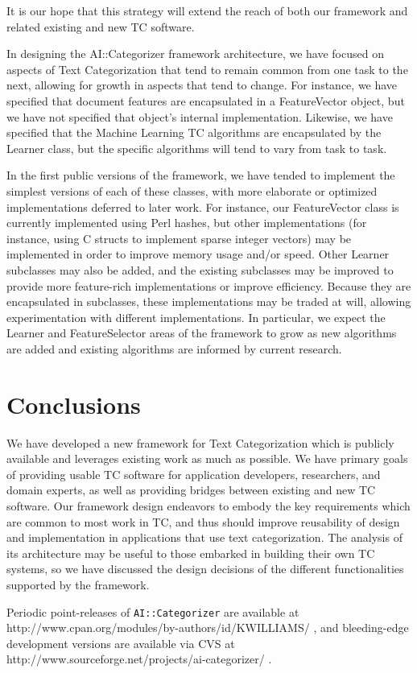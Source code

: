\documentclass[twocolumn]{article}
\begin{document}
It is our hope that this strategy will extend the reach of both our
framework and related existing and new TC software.

In designing the AI::Categorizer framework architecture, we have
focused on aspects of Text Categorization that tend to remain common
from one task to the next, allowing for growth in aspects that tend to
change.  For instance, we have specified that document features are
encapsulated in a FeatureVector object, but we have not specified that
object's internal implementation.  Likewise, we have specified that
the Machine Learning TC algorithms are encapsulated by the Learner
class, but the specific algorithms will tend to vary from task to
task.

In the first public versions of the framework, we have tended to
implement the simplest versions of each of these classes, with more
elaborate or optimized implementations deferred to later work.  For
instance, our FeatureVector class is currently implemented using Perl
hashes, but other implementations (for instance, using C structs to
implement sparse integer vectors) may be implemented in order to
improve memory usage and/or speed.  Other Learner subclasses may also
be added, and the existing subclasses may be improved to provide more
feature-rich implementations or improve efficiency.  Because they are
encapsulated in subclasses, these implementations may be traded at
will, allowing experimentation with different implementations.  In
particular, we expect the Learner and FeatureSelector areas of the
framework to grow as new algorithms are added and existing algorithms
are informed by current research.


\section{Conclusions}

We have developed a new framework for Text Categorization which is
publicly available and leverages existing work as much as possible.
We have primary goals of providing usable TC software for application
developers, researchers, and domain experts, as well as providing
bridges between existing and new TC software.  Our framework design
endeavors to embody the key requirements which are common to most work
in TC, and thus should improve reusability of design and
implementation in applications that use text categorization.  The
analysis of its architecture may be useful to those embarked in building
their own TC systems, so we have discussed the design decisions of the
different functionalities supported by the framework.

Periodic point-releases of \texttt{AI::Categorizer} are available at
http://www.cpan.org/modules/by-authors/id/KWILLIAMS/ , and
bleeding-edge development versions are available via CVS at
http://www.sourceforge.net/projects/ai-categorizer/ .




\end{document}
